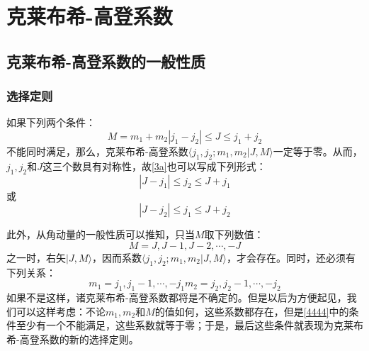 \documentclass[]{article}
\begin{document}
\section{克莱布希-高登系数}
\subsection{克莱布希-高登系数的一般性质}
\subsubsection{选择定则}
如果下列两个条件：
\begin{subequations}
	\begin{equation}
		M=m_1+m_2
		\label{2222}
	\end{equation}
	\begin{equation}
		|j_1-j_2|\leqslant J \leqslant j_1+j_2
		\label{3a}
	\end{equation}
\end{subequations}
不能同时满足，那么，克莱布希-高登系数$\langle j_1,j_2;m_1,m_2|J,M\rangle$一定等于零。从而，$j_1,j_2$和$J$这三个数具有对称性，故\eqref{3a}也可以写成下列形式：
\begin{equation}
	|J-j_1|\leqslant j_2\leqslant J+j_1
\end{equation}
或
\begin{equation}
	|J-j_2|\leqslant j_1\leqslant J+j_2
\end{equation}

此外，从角动量的一般性质可以推知，只当$M$取下列数值：
\begin{equation}
	M=J,J-1,J-2,\cdots,-J
\end{equation}
之一时，右矢$|J,M\rangle$，因而系数$\langle j_1,j_2;m_1,m_2|J,M\rangle$，才会存在。同时，还必须有下列关系：
\begin{subequations}
\begin{equation}
	m_1=j_1,j_1-1,\cdots,-j_1
\end{equation}
\begin{equation}
	m_2=j_2,j_2-1,\cdots,-j_2
\end{equation}
\label{4444}
\end{subequations}
如果不是这样，诸克莱布希-高登系数都将是不确定的。但是以后为方便起见，我们可以这样考虑：不论$m_1,m_2$和$M$的值如何，这些系数都存在，但是\eqref{4444}中的条件至少有一个不能满足，这些系数就等于零；于是，最后这些条件就表现为克莱布希-高登系数的新的选择定则。
\end{document}
